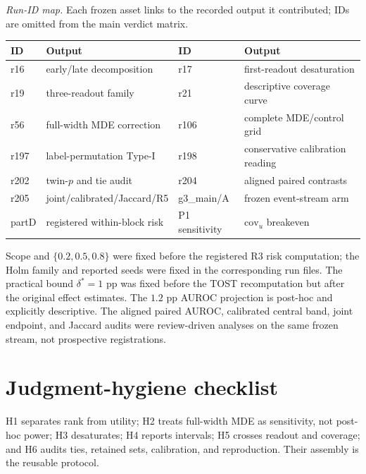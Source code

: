 \documentclass{article}
\begin{document}
\begin{table}[ht]
\smallskip
\emph{Run-ID map.} Each frozen asset links to the recorded output it contributed; IDs are
omitted from the main verdict matrix.
\begin{tabularx}{\textwidth}{@{}l>{\raggedright\arraybackslash}X l>{\raggedright\arraybackslash}X@{}}
\toprule
ID & Output & ID & Output \\
\midrule
r16 & early/late decomposition & r17 & first-readout desaturation \\
r19 & three-readout family & r21 & descriptive coverage curve \\
r56 & full-width MDE correction & r106 & complete MDE/control grid \\
r197 & label-permutation Type-I & r198 & conservative calibration reading \\
r202 & twin-$p$ and tie audit & r204 & aligned paired contrasts \\
r205 & joint/calibrated/Jaccard/R5 & g3\_main/A & frozen event-stream arm \\
partD & registered within-block risk & P1 sensitivity & $\mathrm{cov}_u$ breakeven \\
\bottomrule
\end{tabularx}
\end{table}

Scope and $\{0.2,0.5,0.8\}$ were fixed before the registered R3 risk computation; the Holm
family and reported seeds were fixed in the corresponding run files.  The practical bound
$\delta^*=1$ pp was fixed before the TOST recomputation but after the original effect estimates.
The $1.2$ pp AUROC projection is post-hoc and explicitly descriptive.  The aligned paired AUROC,
calibrated central band, joint endpoint, and Jaccard audits were review-driven analyses on the
same frozen stream, not prospective registrations.

\section{Judgment-hygiene checklist}
\label{app:hygiene}

H1 separates rank from utility; H2 treats full-width MDE as sensitivity, not post-hoc power;
H3 desaturates; H4 reports intervals; H5 crosses readout and coverage; and H6 audits ties,
retained sets, calibration, and reproduction.  Their assembly is the reusable protocol.
\end{document}
